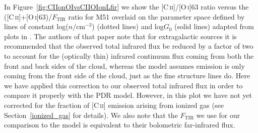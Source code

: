 \documentclass[preprint2]{aastex}
\begin{document}
In Figure~\ref{fig:CIIonOIvsCIIOIonLfir} we show the [C\,\textsc{ii}]/[O\,\textsc{i}]63 ratio versus the ([C\,\textsc{ii}]+[O\,\textsc{i}]63)/$F_{\mathrm{TIR}}$ ratio for M51 overlaid on the parameter space defined by lines of constant log($n/\mathrm{cm}^{-3}$) (dotted lines) and log$G_{0}$ (solid lines) adapted from plots in \citet{1999ApJ...527..795K}.  The authors of that paper note that for extragalactic sources it is recommended that the observed total infrared flux be reduced by a factor of two to account for the (optically thin) infrared continuum flux coming from both the front and back sides of the cloud, whereas the model assumes emission is only coming from the front side of the cloud, just as the fine structure lines do.  Here we have applied this correction to our observed total infrared flux in order to compare it properly with the PDR model.  However, in this plot we have not yet corrected for the fraction of [C\,\textsc{ii}] emission arising from ionized gas (see Section~\ref{ionized_gas} for details).  We also note that the $F_{\mathrm{TIR}}$ we use for our comparison to the \citet{1999ApJ...527..795K} model is equivalent to their bolometric far-infrared flux.
\end{document}
